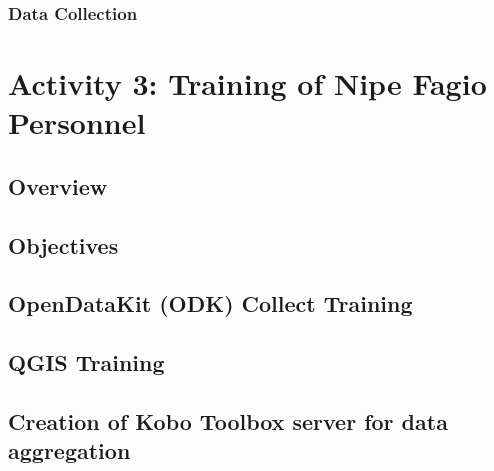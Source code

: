 \documentclass[a4paper,12pt,twoside]{article}
\begin{document}
    \begin{multicols}{2}
    \lipsum[0-2]
    \end{multicols}
    
\subsubsection{Data Collection}

    \begin{multicols}{2}
    \lipsum[0-2]
    \end{multicols}

\section{Activity 3: Training of Nipe Fagio Personnel}

\subsection{Overview}

    \begin{multicols}{2}
    \lipsum[0-5]
    \end{multicols}

\subsection{Objectives}

    \begin{multicols}{2}
    \lipsum[0-5]
    \end{multicols}

\subsection{OpenDataKit (ODK) Collect Training}

    \begin{multicols}{2}
    \lipsum[0-5]
    \end{multicols}

\subsection{QGIS Training}

    \begin{multicols}{2}
    \lipsum[0-5]
    \end{multicols}

\subsection{Creation of Kobo Toolbox  server for data aggregation}
\end{document}
